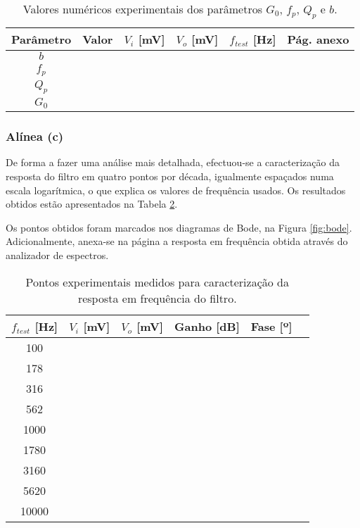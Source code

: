 \begin{table}[!ht]
\centering
\begin{tabular}{|c|c|c|c|c|c|}
\hline
{Parâmetro} &{ Valor} & $V_i$ [mV] & $V_o$ [mV] & $f_{test}$ [Hz] & Pág. anexo \\
\hline\hline
$b$ & \quad\quad\quad\quad\quad\quad\quad & \quad\quad\quad\quad\quad\quad\quad &
	\quad\quad\quad\quad\quad\quad\quad & \quad\quad\quad\quad\quad\quad\quad & \\
\hline
$f_p$ &&&&& \\
\hline
$Q_p$ &&&&& \\
\hline
$G_0$ &&&&& \\
\hline
\end{tabular}
\caption{Valores numéricos experimentais dos parâmetros $G_0$, $f_p$, $Q_p$ e $b$.}
\label{tab:param_exp}
\end{table}

\subsubsection*{Alínea (c)}

De forma a fazer uma análise mais detalhada, efectuou-se a caracterização da resposta do filtro em quatro pontos por década, igualmente espaçados numa escala logarítmica, o que explica os valores de frequência usados. Os resultados obtidos estão apresentados na Tabela \ref{tab:freqs_medidas}.

Os pontos obtidos foram marcados nos diagramas de Bode, na Figura \ref{fig:bode}. Adicionalmente, anexa-se na página \quad\quad\quad a resposta em frequência obtida através do analizador de espectros.

\begin{table}[!ht]
\centering
\begin{tabular}{|c|c|c|c|c|c|}
\hline
$f_{test}$ [Hz] & $V_i$ [mV] & $V_o$ [mV] & Ganho [dB] & Fase [º] \\
\hline\hline
100 & \quad\quad\quad\quad\quad\quad\quad & \quad\quad\quad\quad\quad\quad\quad
	& \quad\quad\quad\quad\quad\quad\quad & \quad\quad\quad\quad\quad\quad\quad \\
\hline
178 &&&& \\
\hline
316 &&&& \\
\hline
562 &&&& \\
\hline
1000 &&&& \\
\hline
1780 &&&& \\
\hline
3160 &&&& \\
\hline
5620 &&&& \\
\hline
10000 &&&& \\
\hline
\end{tabular}
\caption{Pontos experimentais medidos para caracterização da resposta em frequência do filtro.}
\label{tab:freqs_medidas}
\end{table}


